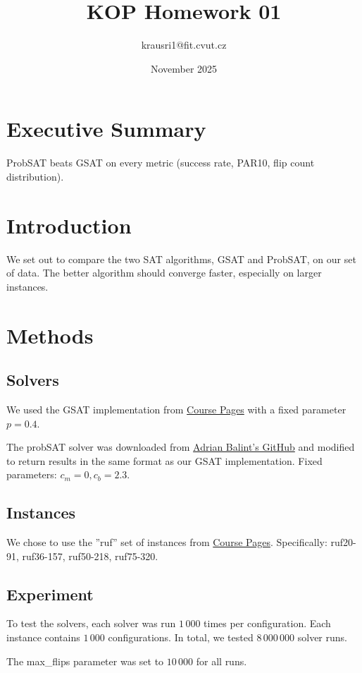 \documentclass[11pt]{article}
\title{KOP Homework 01}
\author{krausri1@fit.cvut.cz}
\date{November 2025}
\begin{document}
\maketitle

\section*{Executive Summary}
ProbSAT beats GSAT on every metric (success rate, PAR10, flip count distribution).

\section{Introduction}
We set out to compare the two SAT algorithms, GSAT and ProbSAT, on our set of data.
The better algorithm should converge faster, especially on larger instances.

\section{Methods}
\subsection{Solvers}
We used the GSAT implementation from \href{https://courses.fit.cvut.cz/NI-KOP/download/index.html}{Course Pages} with a fixed parameter $p=0.4$.

The probSAT solver was downloaded from \href{https://github.com/adrianopolus/probSAT}{Adrian Balint's GitHub}
and modified to return results in the same format as our GSAT implementation.
Fixed parameters:
\(
c_m = 0,
c_b = 2.3
\).

\subsection{Instances}
We chose to use the ''ruf'' set of instances from \href{https://courses.fit.cvut.cz/NI-KOP/download/index.html}{Course Pages}.
Specifically: ruf20-91, ruf36-157, ruf50-218, ruf75-320.

\subsection{Experiment}
To test the solvers, each solver was run $1\,000$ times per configuration.
Each instance contains $1\,000$ configurations.
In total, we tested $8\,000\,000$ solver runs.

The max\_flips parameter was set to $10\,000$ for all runs.
\end{document}
